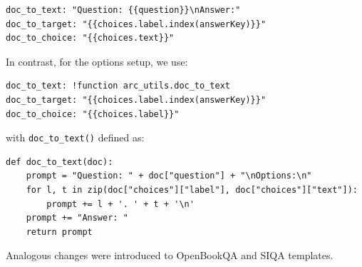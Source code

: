 \documentclass[11pt]{article}
\DeclareRobustCommand{\shl}[3]{
  \begingroup\setlength{\fboxsep}{2pt}%
  \colorbox{#1}{{\hspace*{2pt}\vphantom{Ay}#2\hspace*{2pt}}}%
  \endgroup
}
\begin{document}
\begin{lstlisting}
doc_to_text: "Question: {{question}}\nAnswer:"
doc_to_target: "{{choices.label.index(answerKey)}}"
doc_to_choice: "{{choices.text}}"
\end{lstlisting}

\noindent In contrast, for the \shl{all}{options}{} setup, we use:
\begin{lstlisting}
doc_to_text: !function arc_utils.doc_to_text
doc_to_target: "{{choices.label.index(answerKey)}}"
doc_to_choice: "{{choices.label}}"
\end{lstlisting}
\noindent with \texttt{doc\_to\_text()} defined as:
\begin{lstlisting}
def doc_to_text(doc):
    prompt = "Question: " + doc["question"] + "\nOptions:\n"
    for l, t in zip(doc["choices"]["label"], doc["choices"]["text"]):
        prompt += l + '. ' + t + '\n'
    prompt += "Answer: "
    return prompt
\end{lstlisting}

\noindent Analogous changes were introduced to OpenBookQA and SIQA templates.
\end{document}
